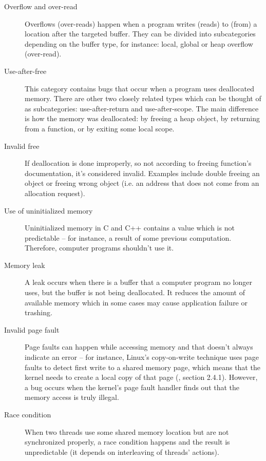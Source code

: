 \documentclass[shortabstract, manyadvisors, english, mgr]{iithesis}
\theoremstyle{definition} \newtheorem*{definition}{Definicja}
\theoremstyle{definition} \newtheorem*{example}{Przykład}
\theoremstyle{definition} \newtheorem*{remark}{Uwaga}
\begin{document}
\begin{description}
    \item[Overflow and over-read] Overflows (over-reads) happen when a program writes (reads) to (from) a location after the targeted buffer. They can be divided into subcategories depending on the buffer type, for instance: local, global or heap overflow (over-read).
    \item[Use-after-free] This category contains bugs that occur when a program uses deallocated memory. There are other two closely related types which can be thought of as subcategories: use-after-return and use-after-scope. The main difference is how the memory was deallocated: by freeing a heap object, by returning from a function, or by exiting some local scope.
    \item[Invalid free] If deallocation is done improperly, so not according to freeing function's documentation, it's considered invalid. Examples include double freeing an object or freeing wrong object (i.e. an address that does not come from an allocation request).
    \item[Use of uninitialized memory] Uninitialized memory in C and C++ contains a value which is not predictable -- for instance, a result of some previous computation. Therefore, computer programs shouldn't use it.
    \item[Memory leak] A leak occurs when there is a buffer that a computer program no longer uses, but the buffer is not being deallocated. It reduces the amount of available memory which in some cases may cause application failure or trashing.
    \item[Invalid page fault] Page faults can happen while accessing memory and that doesn't always indicate an error -- for instance, Linux's copy-on-write technique uses page faults to detect first write to a shared memory page, which means that the kernel needs to create a local copy of that page (\cite{bib:linux-kernel-arch}, section 2.4.1). However, a bug occurs when the kernel's page fault handler finds out that the memory access is truly illegal.
    \item[Race condition] When two threads use some shared memory location but are not synchronized properly, a race condition happens and the result is unpredictable (it depends on interleaving of threads' actions).
\end{description}
\end{document}
